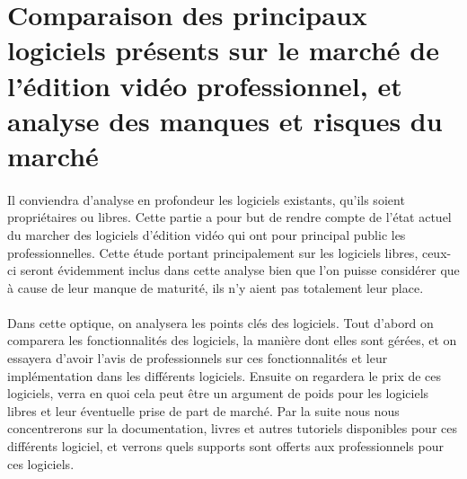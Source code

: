 \section{Comparaison des principaux logiciels présents sur le marché de
l'édition vidéo professionnel, et analyse des manques et risques du marché}

\paragraph{}
  Il conviendra d'analyse en profondeur les logiciels existants, qu'ils soient
  propriétaires ou libres. Cette partie a pour but de rendre compte de
  l'état actuel du marcher des logiciels d'édition vidéo qui ont pour principal
  public les professionnelles. Cette étude portant principalement
  sur les logiciels libres, ceux-ci seront évidemment inclus dans cette analyse
  bien que l'on puisse considérer que à cause de leur manque de maturité, ils
  n'y aient pas totalement leur place.

\paragraph{}
  Dans cette optique, on analysera les points clés des logiciels.
  Tout d'abord on comparera les fonctionnalités des
  logiciels, la manière dont elles sont gérées, et on essayera d'avoir l'avis de
  professionnels sur ces fonctionnalités et leur implémentation dans les différents
  logiciels. Ensuite on regardera le prix de ces logiciels, verra en quoi cela
  peut être un argument de poids pour les logiciels libres et leur éventuelle
  prise de part de marché. Par la suite nous nous concentrerons sur la documentation,
  livres et autres tutoriels disponibles pour ces différents logiciel, et verrons
  quels supports sont offerts aux professionnels pour ces logiciels.

